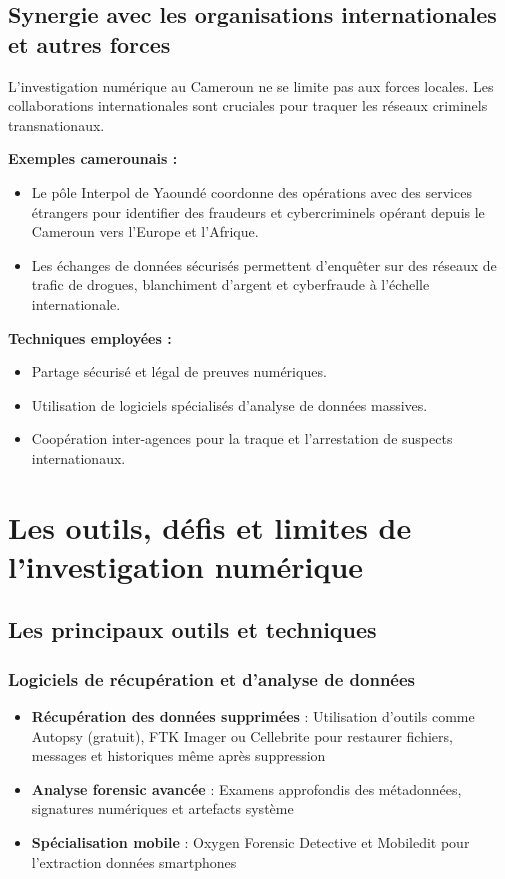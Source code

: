 \documentclass[12pt,a4paper]{article}
\begin{document}
\subsection{Synergie avec les organisations internationales et autres forces}

L'investigation numérique au Cameroun ne se limite pas aux forces locales. Les collaborations internationales sont cruciales pour traquer les réseaux criminels transnationaux.

\textbf{Exemples camerounais :}
\begin{itemize}[leftmargin=*]
    \item Le pôle Interpol de Yaoundé coordonne des opérations avec des services étrangers pour identifier des fraudeurs et cybercriminels opérant depuis le Cameroun vers l'Europe et l'Afrique.
    \item Les échanges de données sécurisés permettent d'enquêter sur des réseaux de trafic de drogues, blanchiment d'argent et cyberfraude à l'échelle internationale.
\end{itemize}

\textbf{Techniques employées :}
\begin{itemize}[leftmargin=*]
    \item Partage sécurisé et légal de preuves numériques.
    \item Utilisation de logiciels spécialisés d'analyse de données massives.
    \item Coopération inter-agences pour la traque et l'arrestation de suspects internationaux.
\end{itemize}

\section{Les outils, défis et limites de l'investigation numérique}

\subsection{Les principaux outils et techniques}

\subsubsection{Logiciels de récupération et d'analyse de données}
\begin{itemize}[leftmargin=*]
    \item \textbf{Récupération des données supprimées} : Utilisation d'outils comme Autopsy (gratuit), FTK Imager ou Cellebrite pour restaurer fichiers, messages et historiques même après suppression
    \item \textbf{Analyse forensic avancée} : Examens approfondis des métadonnées, signatures numériques et artefacts système
    \item \textbf{Spécialisation mobile} : Oxygen Forensic Detective et Mobiledit pour l'extraction données smartphones
\end{itemize}
\end{document}
